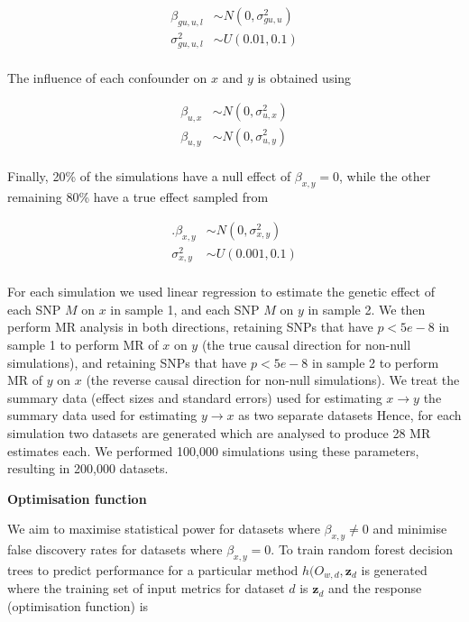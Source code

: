 \documentclass[]{article}
\begin{document}
\[
\begin{aligned}
\beta_{gu,u,l} & \sim N(0, \sigma^2_{gu,u}) \\
\sigma^2_{gu,u,l} & \sim U(0.01, 0.1) \\
\end{aligned}
\]

The influence of each confounder on \(x\) and \(y\) is obtained using

\[
\begin{aligned}
\beta_{u,x} & \sim N(0, \sigma^{2}_{u,x}) \\
\beta_{u,y} & \sim N(0, \sigma^{2}_{u,y}) \\
\end{aligned}
\]

Finally, 20\% of the simulations have a null effect of
\(\beta_{x,y} = 0\), while the other remaining 80\% have a true effect
sampled from

\[
\begin{aligned}.
\beta_{x,y} & \sim N(0, \sigma^2_{x,y}) \\
\sigma^2_{x,y} & \sim U(0.001, 0.1) \\
\end{aligned}
\]

For each simulation we used linear regression to estimate the genetic
effect of each SNP \(M\) on \(x\) in sample 1, and each SNP \(M\) on
\(y\) in sample 2. We then perform MR analysis in both directions,
retaining SNPs that have \(p < 5e-8\) in sample 1 to perform MR of \(x\)
on \(y\) (the true causal direction for non-null simulations), and
retaining SNPs that have \(p < 5e-8\) in sample 2 to perform MR of \(y\)
on \(x\) (the reverse causal direction for non-null simulations). We
treat the summary data (effect sizes and standard errors) used for
estimating \(x \rightarrow y\) the summary data used for estimating
\(y \rightarrow x\) as two separate datasets Hence, for each simulation
two datasets are generated which are analysed to produce 28 MR estimates
each. We performed 100,000 simulations using these parameters, resulting
in 200,000 datasets.

\textbf{Optimisation function}

We aim to maximise statistical power for datasets where
\(\beta_{x,y} \neq 0\) and minimise false discovery rates for datasets
where \(\beta_{x,y} = 0\). To train random forest decision trees to
predict performance for a particular method
\(h(O_{w,d}, \textbf{z}_{d}\) is generated where the training set of
input metrics for dataset \(d\) is \(\textbf{z}_{d}\) and the response
(optimisation function) is
\end{document}
